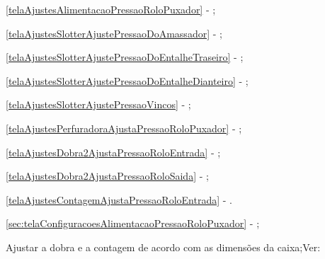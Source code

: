 \begin{procedureAdjustmentNoRecipe}
\begin{pressureAdjustment}
      \item[\ding{\dingNumber}] \ref{telaAjustesAlimentacaoPressaoRoloPuxador} - ;
      \item[\ding{\dingNumber}] \ref{telaAjustesSlotterAjustePressaoDoAmassador} - ;
      \item[\ding{\dingNumber}] \ref{telaAjustesSlotterAjustePressaoDoEntalheTraseiro} - ;
      \item[\ding{\dingNumber}] \ref{telaAjustesSlotterAjustePressaoDoEntalheDianteiro} - ;
      \item[\ding{\dingNumber}] \ref{telaAjustesSlotterAjustePressaoVincos} - ;
      \item[\ding{\dingNumber}] \ref{telaAjustesPerfuradoraAjustaPressaoRoloPuxador} - ;
      \item[\ding{\dingNumber}] \ref{telaAjustesDobra2AjustaPressaoRoloEntrada} - ;
      \item[\ding{\dingNumber}] \ref{telaAjustesDobra2AjustaPressaoRoloSaida} - ;
      \item[\ding{\dingNumber}] \ref{telaAjustesContagemAjustaPressaoRoloEntrada} - .
      
      \newpage
      \thispagestyle{fancy}
      \vspace*{50 pt}

      \else

      \item[\ding{\dingNumber}] \ref{sec:telaConfiguracoesAlimentacaoPressaoRoloPuxador} - ;

      \fi
    \end{pressureAdjustment}

    
  
  \ifmachineType
  \item[\ding{\dingNumber}] Ajustar a dobra e a contagem de acordo com as dimensões da caixa;Ver: 
  \begin{foldCount}
    


\end{foldCount}
\end{procedureAdjustmentNoRecipe}
